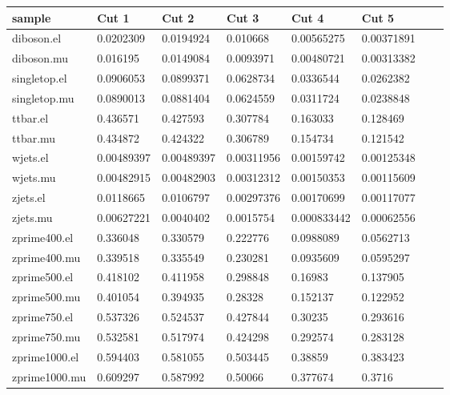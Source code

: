   \begin{table}[H]
    \centering
    \begin{tabular}{l|lllllll}
    sample             & Cut 1 & Cut 2 & Cut 3 & Cut 4     & Cut 5   \\
    \hline
      diboson.el    & 0.0202309  & 0.0194924  & 0.010668   & 0.00565275  & 0.00371891  \\
      diboson.mu    & 0.016195   & 0.0149084  & 0.0093971  & 0.00480721  & 0.00313382  \\
      singletop.el  & 0.0906053  & 0.0899371  & 0.0628734  & 0.0336544   & 0.0262382   \\
      singletop.mu  & 0.0890013  & 0.0881404  & 0.0624559  & 0.0311724   & 0.0238848   \\
      ttbar.el      & 0.436571   & 0.427593   & 0.307784   & 0.163033    & 0.128469    \\
      ttbar.mu      & 0.434872   & 0.424322   & 0.306789   & 0.154734    & 0.121542    \\
      wjets.el      & 0.00489397 & 0.00489397 & 0.00311956 & 0.00159742  & 0.00125348  \\
      wjets.mu      & 0.00482915 & 0.00482903 & 0.00312312 & 0.00150353  & 0.00115609  \\
      zjets.el      & 0.0118665  & 0.0106797  & 0.00297376 & 0.00170699  & 0.00117077  \\
      zjets.mu      & 0.00627221 & 0.0040402  & 0.0015754  & 0.000833442 & 0.00062556  \\
      zprime400.el  & 0.336048   & 0.330579   & 0.222776   & 0.0988089   & 0.0562713   \\
      zprime400.mu  & 0.339518   & 0.335549   & 0.230281   & 0.0935609   & 0.0595297   \\
      zprime500.el  & 0.418102   & 0.411958   & 0.298848   & 0.16983     & 0.137905    \\
      zprime500.mu  & 0.401054   & 0.394935   & 0.28328    & 0.152137    & 0.122952    \\
      zprime750.el  & 0.537326   & 0.524537   & 0.427844   & 0.30235     & 0.293616    \\
      zprime750.mu  & 0.532581   & 0.517974   & 0.424298   & 0.292574    & 0.283128    \\
      zprime1000.el & 0.594403   & 0.581055   & 0.503445   & 0.38859     & 0.383423    \\
      zprime1000.mu & 0.609297   & 0.587992   & 0.50066    & 0.377674    & 0.3716      \\

\end{tabular}
\end{table}
